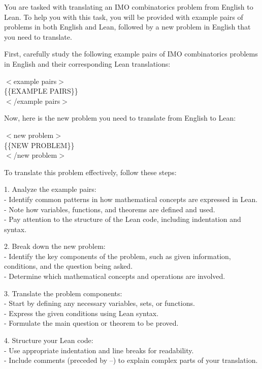 \begin{tcolorbox}[enhanced, breakable, rounded corners, 
    colback=brown!5!white, colframe=brown!75!black,
    colbacktitle=brown!85!black, fonttitle=\bfseries, coltitle=white,
    title= Auto Formalization English to Lean Prompt]
\setlength{\parskip}{1em}

You are tasked with translating an IMO combinatorics problem from English to Lean. To help you with this task, you will be provided with example pairs of problems in both English and Lean, followed by a new problem in English that you need to translate.

First, carefully study the following example pairs of IMO combinatorics problems in English and their corresponding Lean translations:

$<$example pairs$>$\\
\{\{EXAMPLE PAIRS\}\}\\
$<$/example pairs$>$

Now, here is the new problem you need to translate from English to Lean:

$<$new problem$>$\\
\{\{NEW PROBLEM\}\}\\
$<$/new problem$>$

To translate this problem effectively, follow these steps:

1. Analyze the example pairs: \\
   - Identify common patterns in how mathematical concepts are expressed in Lean. \\
   - Note how variables, functions, and theorems are defined and used. \\
   - Pay attention to the structure of the Lean code, including indentation and syntax. 

2. Break down the new problem: \\
   - Identify the key components of the problem, such as given information, conditions, and the question being asked. \\
   - Determine which mathematical concepts and operations are involved. 

3. Translate the problem components: \\
   - Start by defining any necessary variables, sets, or functions. \\
   - Express the given conditions using Lean syntax. \\
   - Formulate the main question or theorem to be proved. 

4. Structure your Lean code: \\
   - Use appropriate indentation and line breaks for readability. \\
   - Include comments (preceded by --) to explain complex parts of your translation. 


\end{tcolorbox}
